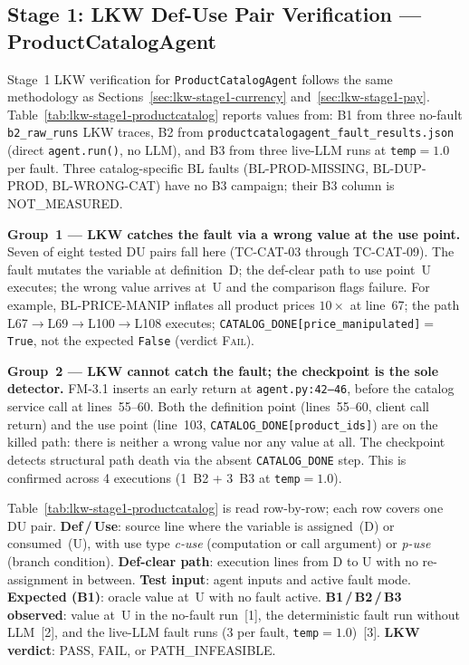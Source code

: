 \documentclass[sigconf,review,anonymous,balance=false]{acmart}
\begin{document}
\subsection{Stage 1: LKW Def-Use Pair Verification --- ProductCatalogAgent}
\label{sec:lkw-stage1-cat}

Stage~1 LKW verification for \texttt{ProductCatalogAgent} follows the same
methodology as Sections~\ref{sec:lkw-stage1-currency}
and~\ref{sec:lkw-stage1-pay}.
Table~\ref{tab:lkw-stage1-productcatalog} reports values from:
B1 from three no-fault \texttt{b2\_raw\_runs} LKW traces,
B2 from \texttt{productcatalogagent\_fault\_results.json} (direct
\texttt{agent.run()}, no LLM), and B3 from three live-LLM runs at
\texttt{temp}$=1.0$ per fault.
Three catalog-specific BL faults (\textsc{BL-PROD-MISSING},
\textsc{BL-DUP-PROD}, \textsc{BL-WRONG-CAT}) have no B3 campaign;
their B3 column is NOT\_MEASURED.

\textbf{Group~1 --- LKW catches the fault via a wrong value at the use point.}
Seven of eight tested DU pairs fall here (TC-CAT-03 through TC-CAT-09).
The fault mutates the variable at definition~D\@; the def-clear path to use
point~U executes; the wrong value arrives at~U and the comparison flags failure.
For example, BL-PRICE-MANIP inflates all product prices $10{\times}$ at
line~67; the path L67$\to$L69$\to$L100$\to$L108 executes;
\texttt{CATALOG\_DONE[price\_manipulated]}$=$\texttt{True}, not the expected
\texttt{False} (verdict \textsc{Fail}).

\textbf{Group~2 --- LKW cannot catch the fault; the checkpoint is the sole detector.}
FM-3.1 inserts an early return at \texttt{agent.py:42--46}, before the
catalog service call at lines~55--60.
Both the definition point (lines~55--60, client call return) and the use
point (line~103, \texttt{CATALOG\_DONE[product\_ids]}) are on the killed path:
there is neither a wrong value nor any value at all.
The checkpoint detects structural path death via the absent
\texttt{CATALOG\_DONE} step.
This is confirmed across 4 executions (1~B2 + 3~B3 at \texttt{temp}$=1.0$).

Table~\ref{tab:lkw-stage1-productcatalog} is read row-by-row; each row covers
one DU pair.
\textbf{Def\,/\,Use}: source line where the variable is assigned~(D) or
consumed~(U), with use type \emph{c-use} (computation or call argument) or
\emph{p-use} (branch condition).
\textbf{Def-clear path}: execution lines from D to U with no re-assignment
in between.
\textbf{Test input}: agent inputs and active fault mode.
\textbf{Expected (B1)}: oracle value at~U with no fault active.
\textbf{B1\,/\,B2\,/\,B3 observed}: value at~U in the no-fault run~[1], the
deterministic fault run without LLM~[2], and the live-LLM fault runs
(3 per fault, \texttt{temp}$=1.0$)~[3].
\textbf{LKW verdict}: PASS, FAIL, or PATH\_INFEASIBLE.
\end{document}
